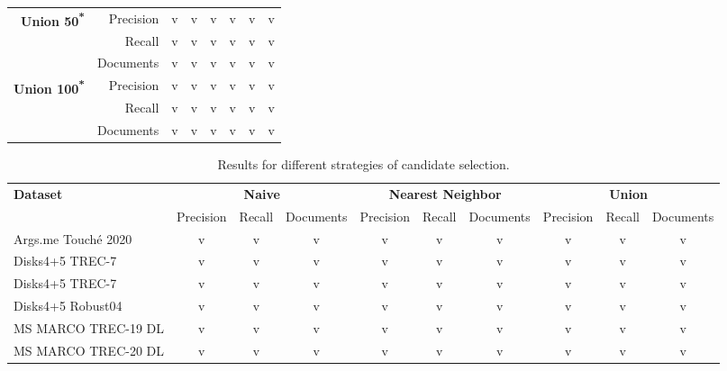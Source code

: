 \begin{table}[h!]
\begin{tabular}{rrcccccc}
        \multirow{3}{*}{\textbf{Union 50\textsuperscript{*}}} & Precision & v & v & v & v & v & v \\
                               & Recall & v & v & v & v & v & v \\
                               & Documents & v & v & v & v & v & v \\
        \midrule

        \multirow{3}{*}{\textbf{Union 100\textsuperscript{*}}} & Precision & v & v & v & v & v & v \\
                               & Recall & v & v & v & v & v & v \\
                               & Documents & v & v & v & v & v & v \\

        \bottomrule 
    \end{tabular}
\end{table}

\begin{sidewaystable}
    \centering
    \footnotesize
    \caption{Results for different strategies of candidate selection.}
    \begin{tabular}{lccccccccc}
        \toprule
        \textbf{Dataset} & \multicolumn{3}{c}{\textbf{Naive}} & \multicolumn{3}{c}{\textbf{Nearest Neighbor}} & \multicolumn{3}{c}{\textbf{Union}} \\
        \cmidrule(lr){2-4} \cmidrule(lr){5-7} \cmidrule(lr){8-10}
                         & Precision & Recall & Documents & Precision & Recall & Documents & Precision & Recall & Documents \\
        \midrule

        Args.me Touché 2020 & v & v & v & v & v & v & v & v & v \\
        Disks4+5 TREC-7     & v & v & v & v & v & v & v & v & v \\
        Disks4+5 TREC-7     & v & v & v & v & v & v & v & v & v \\
        Disks4+5 Robust04   & v & v & v & v & v & v & v & v & v \\
        MS MARCO TREC-19 DL & v & v & v & v & v & v & v & v & v \\
        MS MARCO TREC-20 DL & v & v & v & v & v & v & v & v & v \\

        \bottomrule 
    \end{tabular}
\end{sidewaystable}

